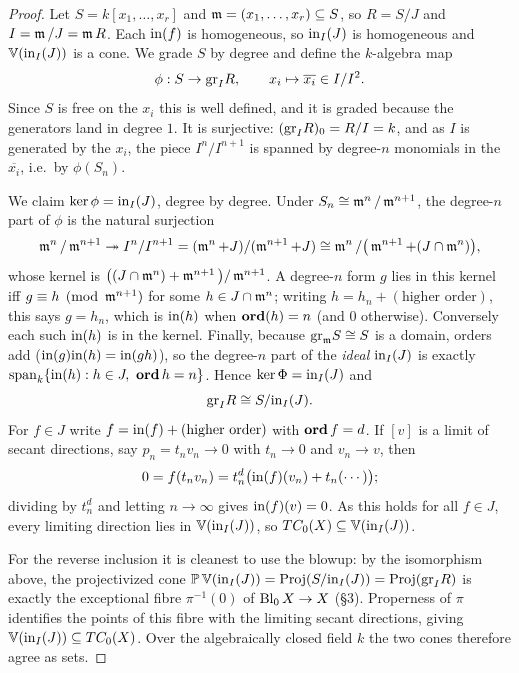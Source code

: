 \documentclass[11pt]{article}
\begin{document}
\begin{proof}
    Let $S = k[x_1, \ldots, x_r]$ and $\operatorname{\mathfrak{m}} = (x_1,\ldots,x_r) \subseteq S$, so $R = S/J$ and $I = \operatorname{\mathfrak{m}}/J = \operatorname{\mathfrak{m}} R$. Each $\text{in}(f)$ is homogeneous, so $\text{in}_I(J)$ is homogeneous and $\mathbb V(\text{in}_I(J))$ is a cone. We grade $S$ by degree and define the $k$-algebra map
    \[\phi : S \to \text{gr}_I R, \qquad x_i \mapsto \overline{x_i} \in I/I^2.\]
    Since $S$ is free on the $x_i$ this is well defined, and it is graded because the generators land in degree $1$. It is surjective: $(\text{gr}_I R)_0 = R/I = k$, and as $I$ is generated by the $x_i$, the piece $I^n/I^{n+1}$ is spanned by degree-$n$ monomials in the $\overline{x_i}$, i.e.\ by $\phi(S_n)$.


    We claim $\ker\phi = \text{in}_I(J)$, degree by degree. Under $S_n \cong \operatorname{\mathfrak{m}}^n/\operatorname{\mathfrak{m}}^{n+1}$, the degree-$n$ part of $\phi$ is the natural surjection
    \[\operatorname{\mathfrak{m}}^n/\operatorname{\mathfrak{m}}^{n+1} \twoheadrightarrow I^n/I^{n+1} = (\operatorname{\mathfrak{m}}^n + J)/(\operatorname{\mathfrak{m}}^{n+1}+J) \cong \operatorname{\mathfrak{m}}^n/\big(\operatorname{\mathfrak{m}}^{n+1} + (J\cap \operatorname{\mathfrak{m}}^n)\big),\]
    whose kernel is $\big((J\cap\operatorname{\mathfrak{m}}^n) + \operatorname{\mathfrak{m}}^{n+1}\big)/\operatorname{\mathfrak{m}}^{n+1}$. A degree-$n$ form $g$ lies in this kernel iff $g \equiv h \pmod{\operatorname{\mathfrak{m}}^{n+1}}$ for some $h \in J \cap \operatorname{\mathfrak{m}}^n$; writing $h = h_n + (\text{higher order})$, this says $g = h_n$, which is $\text{in}(h)$ when $\operatorname{\textbf{ord}}(h)=n$ (and $0$ otherwise). Conversely each such $\text{in}(h)$ is in the kernel. Finally, because $\text{gr}_{\operatorname{\mathfrak{m}}} S \cong S$ is a domain, orders add ($\text{in}(g)\text{in}(h) = \text{in}(gh)$), so the degree-$n$ part of the \emph{ideal} $\text{in}_I(J)$ is exactly $\operatorname{span}_k\{\text{in}(h) : h \in J,\ \operatorname{\textbf{ord}} h = n\}$. Hence $\ker\Phi = \text{in}_I(J)$ and
    \[\text{gr}_I R \cong S/\text{in}_I(J).\]
    For $f \in J$ write $f = \text{in}(f) + (\text{higher order})$ with $\operatorname{\textbf{ord}} f = d$. If $[v]$ is a limit of secant directions, say $p_n = t_n v_n \to 0$ with $t_n \to 0$ and $v_n \to v$, then
    \[0 = f(t_n v_n) = t_n^{d}\big(\text{in}(f)(v_n) + t_n(\cdots)\big);\]
    dividing by $t_n^d$ and letting $n \to \infty$ gives $\text{in}(f)(v) = 0$. As this holds for all $f \in J$, every limiting direction lies in $\mathbb V(\text{in}_I(J))$, so $TC_0(X) \subseteq \mathbb V(\text{in}_I(J))$.

    For the reverse inclusion it is cleanest to use the blowup: by the isomorphism above, the projectivized cone $\mathbb P\,\mathbb V(\text{in}_I(J)) = \text{Proj}(S/\text{in}_I(J)) = \text{Proj}(\text{gr}_I R)$ is exactly the exceptional fibre $\pi^{-1}(0)$ of $\operatorname{Bl}_0 X \to X$ (\S3). Properness of $\pi$ identifies the points of this fibre with the limiting secant directions, giving $\mathbb V(\text{in}_I(J)) \subseteq TC_0(X)$. Over the algebraically closed field $k$ the two cones therefore agree as sets.
\end{proof}
\end{document}
